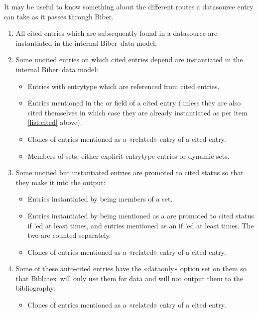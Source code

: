 \documentclass{ltxdockit}
\newcommand*{\biber}{Biber\xspace}
\newcommand*{\biblatex}{Biblatex\xspace}
\begin{document}
It may be useful to know something about the different routes a datasource
entry can take as it passes through \biber.

\begin{enumerate}
\item\label{list:cited} All cited entries which are subsequently found in a
  datasource are instantiated in the internal \biber\ data model.
\item Some uncited entries on which cited entries depend are
  instantiated in the internal \biber\ data model:
  \begin{itemize}
  \item Entries with entrytype  which are referenced from cited
    entries.
  \item Entries mentioned in the  or
     field of a cited entry (unless they are also cited
    themselves in which case they are already instantiated as per item
    \ref{list:cited} above).
      \item Clones of entries mentioned as a «related» entry of a cited
        entry.
      \item Members of sets, either explicit  entrytype entries or
        dynamic sets.
  \end{itemize}
\item Some uncited but instantiated entries are promoted to cited
  status so that they make it into the output:
  \begin{itemize}
  \item Entries instantiated by being members of a set.
  \item Entries instantiated by being mentioned as a  are
    promoted to cited status if 'ed at least
     times, and entries mentioned as an  if
    'ed at least  times. The two are counted
    separately.
  \item Clones of entries mentioned as a «related» entry of a cited entry.
  \end{itemize}
\item Some of these auto-cited entries have the «dataonly» option set on
  them so that \biblatex\ will only use them for data and will not output
  them to the bibliography:
  \begin{itemize}
  \item Clones of entries mentioned as a «related» entry of a cited entry.
  \end{itemize}
\end{enumerate}
\end{document}
